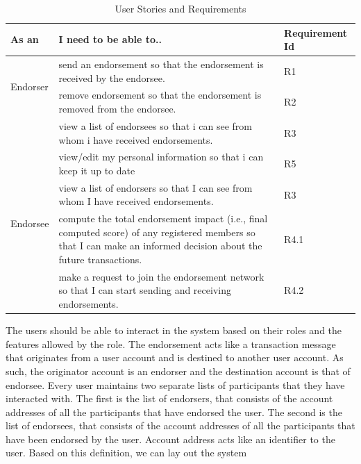 \begin{center} \label{table:userstories} 
	\begin{table}
	\begin{tabular} {| l | p{8cm} | l |}
		\hline
		\textbf{As an}  & \textbf{I need to be able to..}   & \textbf{Requirement Id} \\
		\hline
		\multirow{2}{*}{Endorser} & send an endorsement so that the endorsement
		is received by the endorsee.& R1
		\\\cline{2-3} 
		& remove endorsement so that the endorsement is removed from the
		endorsee.  & R2 \\\cline{2-3}
		& view a list of endorsees so that i can see from whom i have received 
		endorsements.& R3 \\\cline{2-3}
		& view/edit my personal information so that i can keep it up to
		date& R5 \\\cline{2-3}
		\hline
		\multirow{2}{*}{Endorsee} & view a list of endorsers so that I can see
		from whom I have received endorsements.& R3 \\\cline{2-3}
		\hline
		\multirow{2}{*}{other users} & compute the total endorsement
		impact (i.e., final computed score) of any registered members so that I
		can make an informed decision about the future transactions.
		& R4.1 \\\cline{2-3}
		& make a request to join the endorsement network so that I can start
		sending and receiving endorsements.  
		& R4.2 \\\cline{2-3}
		\hline
	\end{tabular}
	\caption{User Stories and Requirements}
\end{table}
\end{center}
\vspace{-15mm}
The users should be able to interact in the system based on their roles and the
features allowed by the role. The endorsement acts like a transaction message
that originates from a user account and is destined to another user account. As
such, the originator account is an endorser and the destination account is that
of endorsee. Every user maintains two separate lists of participants that they
have interacted with. The first is the list of endorsers, that consists of the
account addresses of all the participants that have endorsed the user. The
second is the list of endorsees, that consists of the account addresses of all
the participants that have been endorsed by the user. Account address acts like
an identifier to the user. Based on this definition, we can lay out the system
